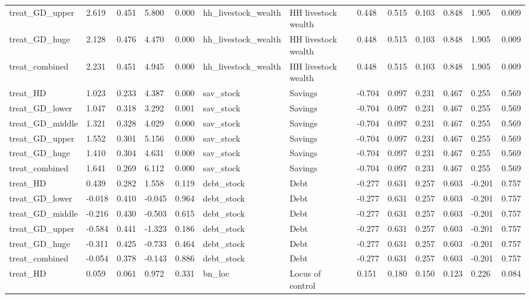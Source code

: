 \begin{tabular}{lllllllllllll}
treat\_GD\_upper & 2.619 & 0.451 & 5.800 & 0.000 & hh\_livestock\_wealth & HH livestock wealth & 0.448 & 0.515 & 0.103 & 0.848 & 1.905 & 0.009 \\
treat\_GD\_huge & 2.128 & 0.476 & 4.470 & 0.000 & hh\_livestock\_wealth & HH livestock wealth & 0.448 & 0.515 & 0.103 & 0.848 & 1.905 & 0.009 \\
treat\_combined & 2.231 & 0.451 & 4.945 & 0.000 & hh\_livestock\_wealth & HH livestock wealth & 0.448 & 0.515 & 0.103 & 0.848 & 1.905 & 0.009 \\
treat\_HD & 1.023 & 0.233 & 4.387 & 0.000 & sav\_stock & Savings & -0.704 & 0.097 & 0.231 & 0.467 & 0.255 & 0.569 \\
treat\_GD\_lower & 1.047 & 0.318 & 3.292 & 0.001 & sav\_stock & Savings & -0.704 & 0.097 & 0.231 & 0.467 & 0.255 & 0.569 \\
treat\_GD\_middle & 1.321 & 0.328 & 4.029 & 0.000 & sav\_stock & Savings & -0.704 & 0.097 & 0.231 & 0.467 & 0.255 & 0.569 \\
treat\_GD\_upper & 1.552 & 0.301 & 5.156 & 0.000 & sav\_stock & Savings & -0.704 & 0.097 & 0.231 & 0.467 & 0.255 & 0.569 \\
treat\_GD\_huge & 1.410 & 0.304 & 4.631 & 0.000 & sav\_stock & Savings & -0.704 & 0.097 & 0.231 & 0.467 & 0.255 & 0.569 \\
treat\_combined & 1.641 & 0.269 & 6.112 & 0.000 & sav\_stock & Savings & -0.704 & 0.097 & 0.231 & 0.467 & 0.255 & 0.569 \\
treat\_HD & 0.439 & 0.282 & 1.558 & 0.119 & debt\_stock & Debt & -0.277 & 0.631 & 0.257 & 0.603 & -0.201 & 0.757 \\
treat\_GD\_lower & -0.018 & 0.410 & -0.045 & 0.964 & debt\_stock & Debt & -0.277 & 0.631 & 0.257 & 0.603 & -0.201 & 0.757 \\
treat\_GD\_middle & -0.216 & 0.430 & -0.503 & 0.615 & debt\_stock & Debt & -0.277 & 0.631 & 0.257 & 0.603 & -0.201 & 0.757 \\
treat\_GD\_upper & -0.584 & 0.441 & -1.323 & 0.186 & debt\_stock & Debt & -0.277 & 0.631 & 0.257 & 0.603 & -0.201 & 0.757 \\
treat\_GD\_huge & -0.311 & 0.425 & -0.733 & 0.464 & debt\_stock & Debt & -0.277 & 0.631 & 0.257 & 0.603 & -0.201 & 0.757 \\
treat\_combined & -0.054 & 0.378 & -0.143 & 0.886 & debt\_stock & Debt & -0.277 & 0.631 & 0.257 & 0.603 & -0.201 & 0.757 \\
treat\_HD & 0.059 & 0.061 & 0.972 & 0.331 & bn\_loc & Locus of control & 0.151 & 0.180 & 0.150 & 0.123 & 0.226 & 0.084 \\

\end{tabular}
